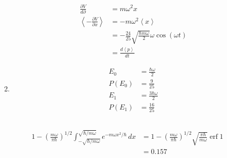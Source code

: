\documentclass{article}
\DeclareMathOperator{\erf}{erf}
\newcommand{\ev}[1]{\left< #1 \right>}
\begin{document}
\begin{enumerate}
\begin{align*}
          \frac{\partial V}{d \partial}       & = m \omega^2 x                                                                                                                                                                         \\
          \ev{-\frac{\partial V}{\partial x}} & = -m \omega^2 \ev{x}                                                                                                                                                                   \\
                                              & = -\frac{24}{25} \sqrt{\frac{\hbar m \omega}{2}} \omega \cos (\omega t)                                                                                                                \\
                                              & = \frac{d \ev{p}}{d t}
        \end{align*}

  \item

        \begin{align*}
          E_0    & = \frac{\hbar \omega}{2}   \\
          P(E_0) & = \frac{9}{25}             \\
          E_1    & = \frac{3 \hbar \omega}{2} \\
          P(E_1) & = \frac{16}{25}
        \end{align*}
\end{enumerate}

\subsection{}

\begin{align*}
  1 - \left( \frac{m \omega}{\pi \hbar} \right)^{1 / 2} \int_{-\sqrt{\hbar / m \omega}}^{\sqrt{\hbar / m \omega}} e^{-m \omega x^2 / \hbar} \,d x & = 1 - \left( \frac{m \omega}{\pi \hbar} \right)^{1 / 2} \sqrt{\frac{\pi \hbar}{m \omega}} \erf 1 \\
                                                                                                                                                  & = 0.157
\end{align*}

\subsection{}
\end{document}
